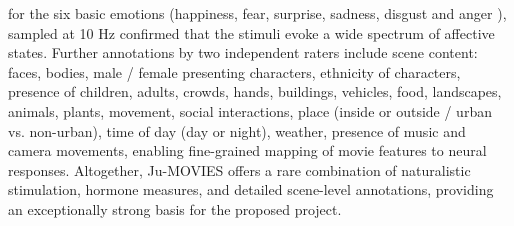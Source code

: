 \documentclass[11pt,a4paper]{article}
\begin{document}
for the six basic emotions (happiness, fear, surprise, sadness, disgust and anger \parencite{ekmanConstantsCulturesFace1971a}), 
sampled at 10 Hz confirmed that the stimuli evoke a wide spectrum of affective states. 
Further annotations by two independent raters include scene content: faces, bodies, male / female presenting characters, ethnicity of characters, presence of children, 
adults, crowds, hands, buildings, vehicles, food, landscapes, animals, plants, movement, social interactions, 
place (inside or outside / urban vs. non-urban), time of day (day or night), weather, presence of music and 
camera movements, enabling fine-grained mapping of movie features to neural responses.
Altogether, Ju-MOVIES offers a rare combination of naturalistic stimulation, hormone measures, 
and detailed scene-level annotations, providing an exceptionally strong basis for the proposed project.
\end{document}
